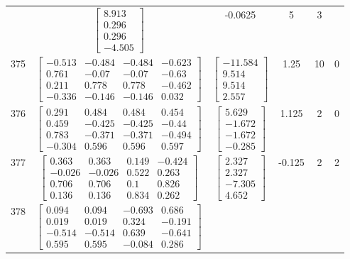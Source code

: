 \documentclass[a4paper,12pt]{article}
\begin{document}
\begin{tabular}{c c c c c c}
&
$\begin{bmatrix} 8.913 \\ 0.296 \\ 0.296 \\ -4.505 \end{bmatrix}$
&
-0.0625
&
5
&
3
\\
375
&
$\begin{bmatrix} -0.513 & -0.484 & -0.484 & -0.623 \\ 0.761 & -0.07 & -0.07 & -0.63 \\ 0.211 & 0.778 & 0.778 & -0.462 \\ -0.336 & -0.146 & -0.146 & 0.032 \end{bmatrix}$
&
$\begin{bmatrix} -11.584 \\ 9.514 \\ 9.514 \\ 2.557 \end{bmatrix}$
&
1.25
&
10
&
0
\\
376
&
$\begin{bmatrix} 0.291 & 0.484 & 0.484 & 0.454 \\ 0.459 & -0.425 & -0.425 & -0.44 \\ 0.783 & -0.371 & -0.371 & -0.494 \\ -0.304 & 0.596 & 0.596 & 0.597 \end{bmatrix}$
&
$\begin{bmatrix} 5.629 \\ -1.672 \\ -1.672 \\ -0.285 \end{bmatrix}$
&
1.125
&
2
&
0
\\
377
&
$\begin{bmatrix} 0.363 & 0.363 & 0.149 & -0.424 \\ -0.026 & -0.026 & 0.522 & 0.263 \\ 0.706 & 0.706 & 0.1 & 0.826 \\ 0.136 & 0.136 & 0.834 & 0.262 \end{bmatrix}$
&
$\begin{bmatrix} 2.327 \\ 2.327 \\ -7.305 \\ 4.652 \end{bmatrix}$
&
-0.125
&
2
&
2
\\
378
&
$\begin{bmatrix} 0.094 & 0.094 & -0.693 & 0.686 \\ 0.019 & 0.019 & 0.324 & -0.191 \\ -0.514 & -0.514 & 0.639 & -0.641 \\ 0.595 & 0.595 & -0.084 & 0.286 \end{bmatrix}$

\end{tabular}
\end{document}
